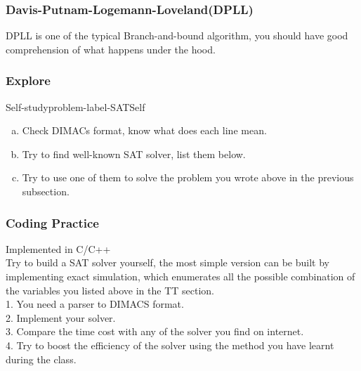 \documentclass[main.tex]{subfiles}
\begin{document}
\subsubsection{Davis-Putnam-Logemann-Loveland(DPLL)}
DPLL is one of the typical Branch-and-bound algorithm, you should have good comprehension of what happens under the hood.

\subsubsection{Explore}
\begin{problem}{Self-study}{problem-label-SATSelf}
\begin{enumerate}[(a)]
    \item Check DIMACs format, know what does each line mean.
    \item Try to find well-known SAT solver, list them below.
    \item Try to use one of them to solve the problem you wrote above in the previous subsection.
\end{enumerate}
\end{problem}

\vspace*{4\baselineskip}
\subsubsection{Coding Practice}
Implemented in C/C++\\
Try to build a SAT solver yourself, the most simple version can be built by implementing exact simulation, which enumerates all the possible combination of the variables you listed above in the TT section.\\
1. You need a parser to DIMACS format.\\
2. Implement your solver.\\
3. Compare the time cost with any of the solver you find on internet.\\
4. Try to boost the efficiency of the solver using the method you have learnt during the class.
\end{document}
